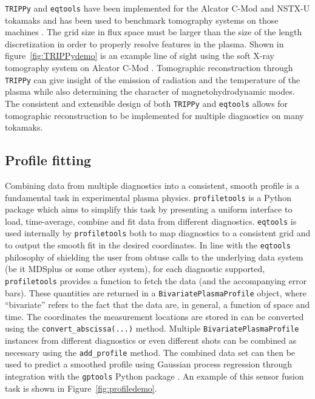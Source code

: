 \documentclass{elsarticle}
\newcommand{\eqtools}{\texttt{eqtools}\xspace}
\newcommand{\profiletools}{\texttt{profiletools}\xspace}
\newcommand{\TRIPPy}{\texttt{TRIPPy}\xspace}
\newcommand{\gptools}{\texttt{gptools}\xspace}
\begin{document}
\TRIPPy and \eqtools have been implemented for the Alcator C-Mod and NSTX-U tokamaks and has been used to benchmark tomography systems on those machines \cite{Faust2014}. 
The grid size in flux space must be larger than the size of the length discretization in order to properly resolve features in the plasma.
Shown in figure~\ref{fig:TRIPPydemo} is an example line of sight using the soft X-ray tomography system on Alcator C-Mod \cite{Granetz1991}.
Tomographic reconstruction through \TRIPPy can give insight of the emission of radiation and the temperature of the plasma while also determining the character of magnetohydrodynamic modes.
The consistent and extensible design of both \TRIPPy and \eqtools allows for tomographic reconstruction to be implemented for multiple diagnostics on many tokamaks.

\subsection{Profile fitting}
Combining data from multiple diagnostics into a consistent, smooth profile is a fundamental task in experimental plasma physics.
\profiletools \cite{profiletools_git,profiletools_readthedocs} is a Python package which aims to simplify this task by presenting a uniform interface to load, time-average, combine and fit data from different diagnostics.
\eqtools is used internally by \profiletools both to map diagnostics to a consistent grid and to output the smooth fit in the desired coordinates.
In line with the \eqtools philosophy of shielding the user from obtuse calls to the underlying data system (be it MDSplus or some other system), for each diagnostic supported, \profiletools provides a function to fetch the data (and the accompanying error bars).
These quantities are returned in a \verb|BivariatePlasmaProfile| object, where ``bivariate'' refers to the fact that the data are, in general, a function of space and time.
The coordinates the measurement locations are stored in can be converted using the \verb|convert_abscissa(...)| method.
Multiple \verb|BivariatePlasmaProfile| instances from different diagnostics or even different shots can be combined as necessary using the \verb|add_profile| method.
The combined data set can then be used to predict a smoothed profile using Gaussian process regression \cite{gpr_nf} through integration with the \gptools Python package \cite{gptools_git,gptools_readthedocs}.
An example of this sensor fusion task is shown in Figure~\ref{fig:profiledemo}.
\end{document}

